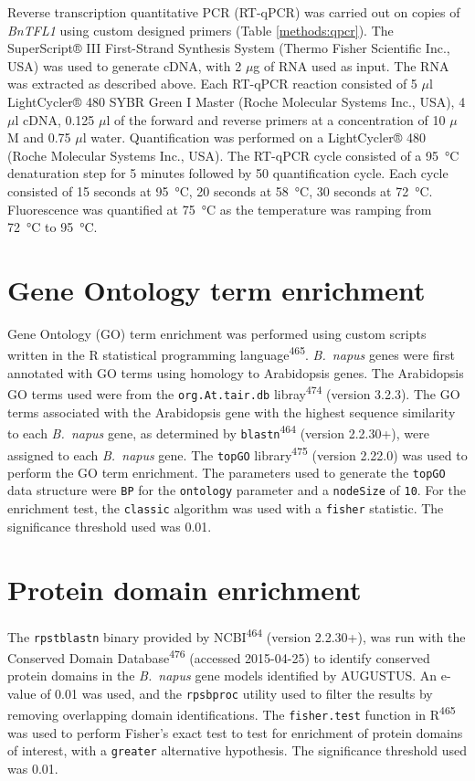 \documentclass[12pt,]{book}
\begin{document}
Reverse transcription quantitative PCR (RT-qPCR) was carried out on
copies of \emph{BnTFL1} using custom designed primers (Table
\ref{methods:qpcr}). The SuperScript® III First-Strand Synthesis System
(Thermo Fisher Scientific Inc., USA) was used to generate cDNA, with 2
\(\mu\)g of RNA used as input. The RNA was extracted as described above.
Each RT-qPCR reaction consisted of 5 \(\mu\)l LightCycler® 480 SYBR
Green I Master (Roche Molecular Systems Inc., USA), 4 \(\mu\)l cDNA,
0.125 \(\mu\)l of the forward and reverse primers at a concentration of
10 \(\mu\)M and 0.75 \(\mu\)l water. Quantification was performed on a
LightCycler® 480 (Roche Molecular Systems Inc., USA). The RT-qPCR cycle
consisted of a 95~°C denaturation step for 5 minutes followed by 50
quantification cycle. Each cycle consisted of 15 seconds at 95~°C, 20
seconds at 58~°C, 30 seconds at 72~°C. Fluorescence was quantified at
75~°C as the temperature was ramping from 72~°C to 95~°C.

\section{Gene Ontology term
enrichment}\label{gene-ontology-term-enrichment}

Gene Ontology (GO) term enrichment was performed using custom scripts
written in the R statistical programming language\textsuperscript{465}.
\emph{B.~napus} genes were first annotated with GO terms using homology
to Arabidopsis genes. The Arabidopsis GO terms used were from the
\texttt{org.At.tair.db} libray\textsuperscript{474} (version 3.2.3). The
GO terms associated with the Arabidopsis gene with the highest sequence
similarity to each \emph{B.~napus} gene, as determined by
\texttt{blastn}\textsuperscript{464} (version 2.2.30+), were assigned to
each \emph{B.~napus} gene. The \texttt{topGO}
library\textsuperscript{475} (version 2.22.0) was used to perform the GO
term enrichment. The parameters used to generate the \texttt{topGO} data
structure were \texttt{BP} for the \texttt{ontology} parameter and a
\texttt{nodeSize} of \texttt{10}. For the enrichment test, the
\texttt{classic} algorithm was used with a \texttt{fisher} statistic.
The significance threshold used was 0.01.

\section{Protein domain
enrichment}\label{section:methods:proteinenrichment}

The \texttt{rpstblastn} binary provided by NCBI\textsuperscript{464}
(version 2.2.30+), was run with the Conserved Domain
Database\textsuperscript{476} (accessed 2015-04-25) to identify
conserved protein domains in the \emph{B.~napus} gene models identified
by AUGUSTUS. An e-value of 0.01 was used, and the \texttt{rpsbproc}
utility used to filter the results by removing overlapping domain
identifications. The \texttt{fisher.test} function in
R\textsuperscript{465} was used to perform Fisher's exact test to test
for enrichment of protein domains of interest, with a \texttt{greater}
alternative hypothesis. The significance threshold used was 0.01.
\end{document}
